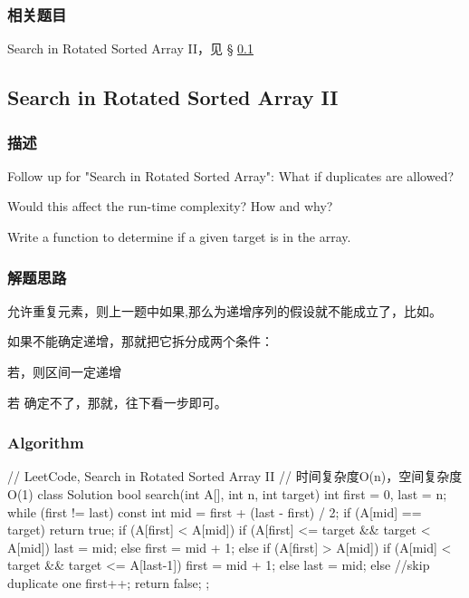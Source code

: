 \subsubsection{相关题目}

\begindot
\item Search in Rotated Sorted Array II，见 \S 
\ref{sec:search-in-rotated-sorted-array-ii}
\myenddot


\subsection{Search in Rotated Sorted Array II}
\label{sec:search-in-rotated-sorted-array-ii}


\subsubsection{描述}
Follow up for "Search in Rotated Sorted Array": What if duplicates are 
allowed?

Would this affect the run-time complexity? How and why?

Write a function to determine if a given target is in the array.


\subsubsection{解题思路}
允许重复元素，则上一题中如果,那么\fn{[l,m]}为递增序列的假设就不能成立了，比如\code{[1,3,1,1,1]}。

如果不能确定递增，那就把它拆分成两个条件：
\begindot
\item 若，则区间\fn{[l,m]}一定递增
\item 若 确定不了，那就，往下看一步即可。
\myenddot

\subsubsection{Algorithm}
\begin{Code}
	// LeetCode, Search in Rotated Sorted Array II
	// 时间复杂度O(n)，空间复杂度O(1)
	class Solution {
		bool search(int A[], int n, int target) {
			int first = 0, last = n;
			while (first != last) {
				const int mid = first  + (last - first) / 2;
				if (A[mid] == target)	return true;
				if (A[first] < A[mid]) {
					if (A[first] <= target && target < A[mid])
						last = mid;
					else	first = mid + 1;
				} else if (A[first] > A[mid]) {
					if (A[mid] < target && target <= A[last-1])
						first = mid + 1;
					else	last = mid;
				} else //skip duplicate one
					first++;
			}
			return false;
		}
	};
\end{Code}


